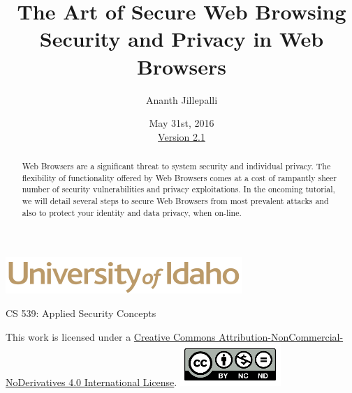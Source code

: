\documentclass[12pt]{extarticle}
\begin{document}
	\title{ The Art of Secure Web Browsing \\ \large Security and Privacy in Web Browsers}
	\author{Ananth Jillepalli}
	\date{May 31st, 2016 \\ \hyperref[changelog]{Version 2.1}} %
	\renewcommand{\abstractname}{Summary}
	\begin{titlepage}
		\maketitle
		\begin{center}
			\includegraphics[scale=.5]{UofI}
			
			\large{CS 539: Applied Security Concepts}
			
			\vskip 40pt
			
		\end{center}
		\begin{abstract}
			Web Browsers are a significant threat to system security and individual privacy. The flexibility of functionality offered by Web Browsers comes at a cost of rampantly sheer number of security vulnerabilities and privacy exploitations. In the oncoming tutorial, we will detail several steps to secure Web Browsers from most prevalent attacks and also to protect your identity and data privacy, when on-line.
		\end{abstract}
		
		
		\vfill
		\begin{center}
		This work is licensed under a \href{https://creativecommons.org/licenses/by-nc-nd/2.0/}{Creative Commons Attribution-NonCommercial-NoDerivatives 4.0 International License}.
		\vskip 10pt
		\includegraphics[scale=.5]{cc}
		\end{center}
		
	\end{titlepage}
	
	
	\pagebreak
	\tableofcontents
	
	
\end{document}
